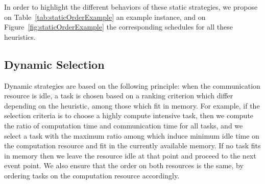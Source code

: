 \documentclass[sigconf]{acmart}
\begin{document}
	In order to highlight the different behaviors of these static strategies, we propose on Table~\ref{tab:staticOrderExample} an example instance, and on Figure~\ref{fig:staticOrderExample} the corresponding schedules for all these heuristics.
	
	
	
	
	\subsection{Dynamic Selection}
	Dynamic strategies are based on the following principle: when the communication resource is idle, a task is chosen based on a ranking criterion which differ depending on the heuristic, among those which fit in memory. For example, if the selection criteria is to choose a highly compute intensive task, then we compute the ratio of computation time and communication time for all tasks, and we select a task with the maximum ratio among which induce minimum idle time on the computation resource and fit in the currently available memory. If no task fits in memory then we leave the resource idle at that point and proceed to the next event point. We also ensure that the order on both resources is the same, by ordering tasks on the computation resource accordingly.
	
	
	
	
\end{document}
